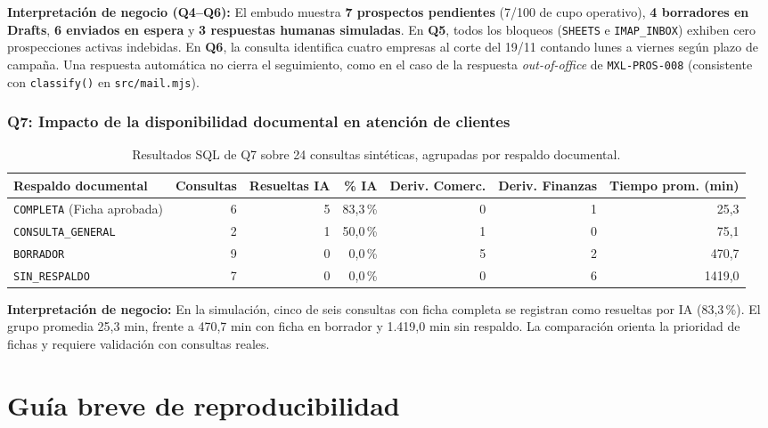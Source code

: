 \documentclass{article}
\begin{document}
\textbf{Interpretación de negocio (Q4--Q6):} El embudo muestra \textbf{7 prospectos pendientes} (7/100 de cupo operativo), \textbf{4 borradores en Drafts}, \textbf{6 enviados en espera} y \textbf{3 respuestas humanas simuladas}. En \textbf{Q5}, todos los bloqueos (\texttt{SHEETS} e \texttt{IMAP\_INBOX}) exhiben cero prospecciones activas indebidas. En \textbf{Q6}, la consulta identifica cuatro empresas al corte del 19/11 contando lunes a viernes según plazo de campaña. Una respuesta automática no cierra el seguimiento, como en el caso de la respuesta \emph{out-of-office} de \texttt{MXL-PROS-008} (consistente con \texttt{classify()} en \texttt{src/mail.mjs}).

\subsubsection*{Q7: Impacto de la disponibilidad documental en atención de clientes}

\begin{table}[H]
\centering
\scriptsize
\begin{tabularx}{\textwidth}{Lrrrrrr}
\toprule
\textbf{Respaldo documental} & \textbf{Consultas} & \textbf{Resueltas IA} & \textbf{\% IA} & \textbf{Deriv. Comerc.} & \textbf{Deriv. Finanzas} & \textbf{Tiempo prom. (min)} \\
\midrule
\texttt{COMPLETA} (Ficha aprobada) & 6 & 5 & 83,3\,\% & 0 & 1 & 25,3 \\
\texttt{CONSULTA\_GENERAL} & 2 & 1 & 50,0\,\% & 1 & 0 & 75,1 \\
\texttt{BORRADOR} & 9 & 0 & 0,0\,\% & 5 & 2 & 470,7 \\
\texttt{SIN\_RESPALDO} & 7 & 0 & 0,0\,\% & 0 & 6 & 1419,0 \\
\bottomrule
\end{tabularx}
\caption{Resultados SQL de Q7 sobre 24 consultas sintéticas, agrupadas por respaldo documental.}
\end{table}

\textbf{Interpretación de negocio:} En la simulación, cinco de seis consultas con ficha completa se registran como resueltas por IA (83,3\,\%). El grupo promedia 25,3 min, frente a 470,7 min con ficha en borrador y 1.419,0 min sin respaldo. La comparación orienta la prioridad de fichas y requiere validación con consultas reales.

\section{Guía breve de reproducibilidad}
\end{document}
